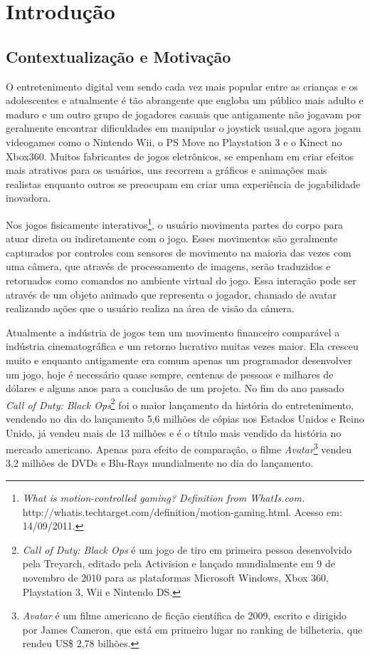 \chapter{Introdução}

\section{Contextualização e Motivação}

O entretenimento digital vem sendo cada vez mais popular entre as crianças e os adolescentes e atualmente é tão abrangente que engloba um público mais adulto e maduro
e um outro grupo de jogadores casuais que antigamente não jogavam por geralmente encontrar dificuldades em manipular o joystick usual,que agora jogam videogames como
o Nintendo Wii, o PS Move no Playstation 3 e o Kinect no Xbox360. Muitos fabricantes de jogos eletrônicos, se empenham em criar efeitos mais atrativos para os
usuários, uns recorrem a gráficos e animações mais realistas enquanto outros se preocupam em criar  uma experiência de jogabilidade inovadora.\cite{WiiWillRockYou}

Nos jogos fisicamente interativos\footnote{\textit{What is motion-controlled gaming? Definition from WhatIs.com.}
http://whatis.techtarget.com/definition/motion-gaming.html. Acesso  em: 14/09/2011.}, o usuário movimenta partes do corpo para atuar direta ou indiretamente com
o jogo. Esses movimentos são geralmente capturados por controles com sensores de movimento na maioria das vezes com uma câmera, que através de processamento de
imagens, serão traduzidos e retornados como comandos no ambiente virtual do jogo. Essa interação pode ser através de um objeto animado que representa o jogador,
chamado de avatar realizando ações que o usuário realiza na área de visão da câmera.

Atualmente a indústria de jogos tem um movimento financeiro comparável a indústria cinematográfica e um retorno lucrativo muitas vezes maior.
Ela cresceu muito e enquanto antigamente era comum apenas um programador desenvolver um jogo, hoje é necessário quase sempre, centenas de pessoas e milhares de
dólares e alguns anos para a conclusão de um projeto. No fim do ano passado \textit{Call of Duty: Black Ops}\footnote{\textit{Call of Duty: Black Ops} é um jogo de
tiro em primeira pessoa desenvolvido pela Treyarch, editado pela Activision e lançado mundialmente em 9 de novembro de 2010 para as plataformas Microsoft Windows,
 Xbox 360, Playstation 3, Wii e Nintendo DS.} foi o maior lançamento da história do entretenimento,
vendendo no dia do lançamento 5,6 milhões de cópias nos Estados Unidos e Reino Unido, já vendeu mais de 13 milhões e é o título mais vendido da história no mercado
americano. Apenas para efeito de comparação, o filme \textit{Avatar}\footnote{\textit{Avatar} é um filme americano de ficção científica de 2009, escrito e dirigido
por James Cameron, que está em primeiro lugar no ranking de bilheteria, que rendeu US\$ 2,78 bilhões.} vendeu 3,2 milhões de DVDs e Blu-Rays mundialmente no dia do
 lançamento.\cite{TamanhoIndustriaGames}

